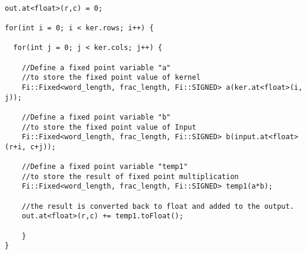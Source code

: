 
\lstset{framesep=-10pt, xleftmargin=-10pt}
\begin{lstlisting}[caption={Two Dimensional Convolution Operation Code Snippet},label={listing:61}]

out.at<float>(r,c) = 0;

for(int i = 0; i < ker.rows; i++) {

  for(int j = 0; j < ker.cols; j++) {   
    
    //Define a fixed point variable "a"
    //to store the fixed point value of kernel
    Fi::Fixed<word_length, frac_length, Fi::SIGNED> a(ker.at<float>(i, j));
    
    //Define a fixed point variable "b" 
    //to store the fixed point value of Input
    Fi::Fixed<word_length, frac_length, Fi::SIGNED> b(input.at<float>(r+i, c+j));
    
    //Define a fixed point variable "temp1" 
    //to store the result of fixed point multiplication
    Fi::Fixed<word_length, frac_length, Fi::SIGNED> temp1(a*b);
    
    //the result is converted back to float and added to the output.
	out.at<float>(r,c) += temp1.toFloat();
	
	}
}
\end{lstlisting}

